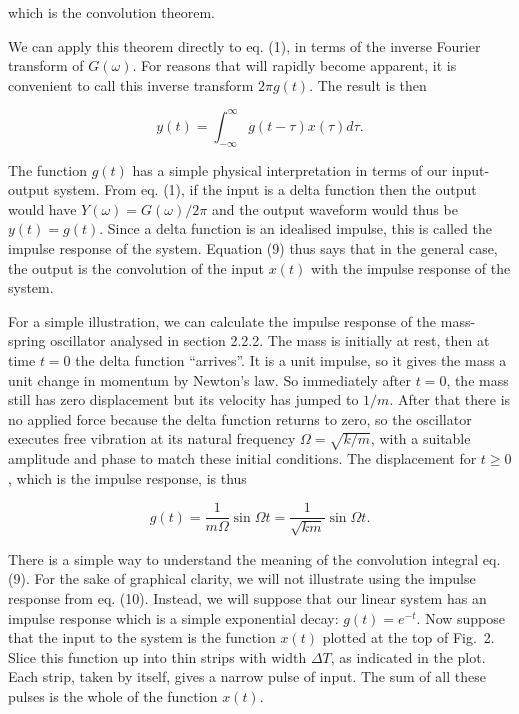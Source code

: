   which is the convolution theorem. 

  We can apply this theorem directly to eq. (1), in terms of the inverse 
  Fourier transform of $G(\omega)$. For reasons that will rapidly become 
  apparent, it is convenient to call this inverse transform $2 \pi g(t)$. The 
  result is then 

  $$y(t)= \int_{-\infty}^{\infty}{g(t-\tau) x(\tau) d \tau} . \tag{9}$$ 

  The function $g(t)$ has a simple physical interpretation in terms of our 
  input-output system. From eq. (1), if the input is a delta function then the 
  output would have $Y(\omega)=G(\omega)/2 \pi$ and the output waveform would 
  thus be $y(t)=g(t)$. Since a delta function is an idealised impulse, this is 
  called the impulse response of the system. Equation (9) thus says that in the 
  general case, the output is the convolution of the input $x(t)$ with the 
  impulse response of the system. 

  For a simple illustration, we can calculate the impulse response of the 
  mass-spring oscillator analysed in section 2.2.2. The mass is initially at 
  rest, then at time $t=0$ the delta function ``arrives''. It is a unit 
  impulse, so it gives the mass a unit change in momentum by Newton's law. So 
  immediately after $t=0$, the mass still has zero displacement but its 
  velocity has jumped to $1/m$. After that there is no applied force because 
  the delta function returns to zero, so the oscillator executes free vibration 
  at its natural frequency $\Omega=\sqrt{k/m}$, with a suitable amplitude and 
  phase to match these initial conditions. The displacement for $t \ge 0$, 
  which is the impulse response, is thus 

  $$g(t) = \dfrac{1}{m \Omega} \sin \Omega t= \dfrac{1}{\sqrt{k m}} \sin \Omega 
  t . \tag{10}$$ 

  There is a simple way to understand the meaning of the convolution integral 
  eq. (9). For the sake of graphical clarity, we will not illustrate using the 
  impulse response from eq. (10). Instead, we will suppose that our linear 
  system has an impulse response which is a simple exponential decay: 
  $g(t)=e^{-t}$. Now suppose that the input to the system is the function 
  $x(t)$ plotted at the top of Fig.\ 2. Slice this function up into thin strips 
  with width $\Delta T$, as indicated in the plot. Each strip, taken by itself, 
  gives a narrow pulse of input. The sum of all these pulses is the whole of 
  the function $x(t)$. 

